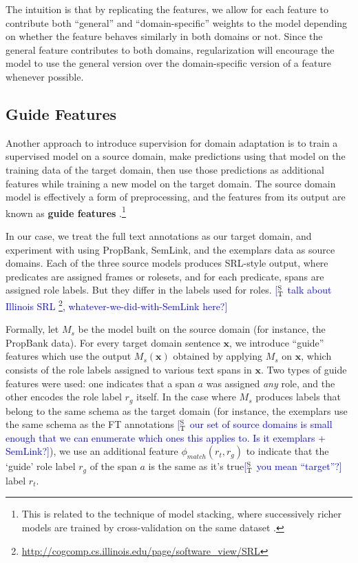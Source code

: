 \documentclass[11pt,a4paper]{article}
\newcommand{\ensuretext}[1]{#1}
\newcommand{\stmarker}{\ensuretext{\textcolor{blue}{\ensuremath{^{\textsc{S}}_{\textsc{T}}}}}}
\newcommand{\arkcomment}[3]{\ensuretext{\textcolor{#3}{[#1 #2]}}}
\newcommand{\st}[1]{\arkcomment{\stmarker}{#1}{blue}}
\newcommand{\x}{\mathbf{x}}
\begin{document}
The intuition is that by replicating the features, we allow for
each feature to contribute both ``general'' and ``domain-specific'' weights to the model depending on whether the feature
behaves similarly in both domains or not.
Since the general feature contributes to both domains, regularization will encourage the model to use the general version over the domain-specific version of a feature whenever possible.

\subsection{Guide Features}
\label{sec:guide}
Another approach to introduce supervision for domain adaptation %
is to train a supervised model on a source domain, make predictions using that model on the training data of the target domain, then use those predictions as additional features while training a new model on the target domain.
The source domain model is effectively a form of preprocessing, and the features from its output are known as \textbf{guide features} \citep{johansson-13,kong-14}.\footnote{This is related to the technique
of model stacking, where successively richer models are trained by cross-validation on the same dataset 
\citet[e.g.,][]{cohen-05,nivre-08,martins-08}.}

In our case, we treat the full text annotations as our target domain, and experiment with using PropBank, SemLink, and the exemplars data as source domains.
Each of the three source models produces SRL-style output, where predicates are assigned frames or rolesets, and for each predicate, spans are assigned role labels.
But they differ in the labels used for roles.
\st{talk about Illinois SRL \citep{punyakanok-08}\footnote{\url{http://cogcomp.cs.illinois.edu/page/software_view/SRL}}, whatever-we-did-with-SemLink here?}

Formally, let $M_{s}$ be the model built on
the source domain (for instance, the PropBank data). 
For every target domain sentence $\x$, we introduce ``guide'' features which use the output $M_s(\x)$
obtained by applying $M_s$ on $\x$, which consists of the role labels assigned to various text spans in $\x$.
Two types of guide features were used:
one indicates that a span $a$ was assigned \emph{any} role, and the other encodes the role label $r_g$ itself.
In the case where $M_s$ produces labels
that belong to the same schema as the target domain 
(for instance, the exemplars use the same schema as the FT annotations \st{our set of source domains is small enough that we can enumerate which ones this applies to. Is it exemplars + SemLink?}), 
we use an additional feature $\phi_{match}(r_t,r_g)$ to indicate that 
the `guide' role label $r_g$ of the span $a$ is the same as it's true\st{you mean ``target''?} label $r_t$.
\end{document}
